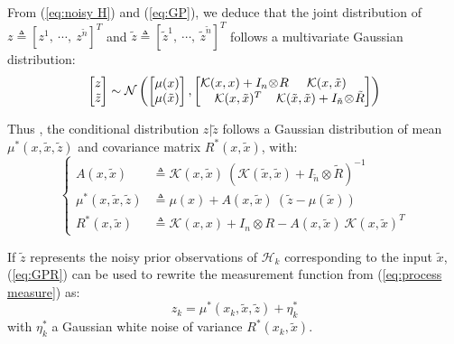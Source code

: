 \documentclass[conference]{IEEEtran}
\begin{document}
From (\ref{eq:noisy H}) and (\ref{eq:GP}), we deduce that the joint distribution of $z \triangleq [z^1, \: \cdots, \: z^{\tilde n}]^T$ and $\tilde{z} \triangleq [\tilde z^1, \: \cdots, \: \tilde z^{\tilde n}]^T$ follows a multivariate Gaussian distribution:
\begin{equation}
\begin{bmatrix}z \\ \tilde{z}\end{bmatrix} \sim \mathcal{N}\left(
\begin{bmatrix}\mu(x) \\ \mu(\tilde{x})\end{bmatrix},
\begin{bmatrix}
\mathcal{K}(       x,  x) + I_n\!\otimes\!R \hspace{-3.5mm} &
\mathcal{K}(       x,  \tilde{x}) \\
\mathcal{K}(x, \tilde{x})^T & \hspace{-3.5mm}
\mathcal{K}(\tilde{x}, \tilde{x}) + I_{\tilde n}\!\otimes\!\tilde R
\end{bmatrix}
\right)
\end{equation}

Thus \cite{bib:Rasmussen}, the conditional distribution $z|\tilde{z}$ follows a Gaussian distribution of mean $\mu^*(x, \tilde{x}, \tilde{z})$ and covariance matrix $R^*(x, \tilde{x})$, with:
\begin{equation}
\left\{
\begin{aligned}
A(x, \tilde{x}) &  \triangleq
\mathcal{K}(x, \tilde{x}) \:
\left(\mathcal{K}(\tilde{x}, \tilde{x}) + I_{\tilde n} \otimes \tilde R\right)^{-1} \\
\mu^*(x, \tilde{x}, \tilde{z}) & \triangleq
\mu(x) + A(x, \tilde{x}) \:
(\tilde{z} - \mu(\tilde{x})) \\
R^*(x, \tilde{x}) & \triangleq
\mathcal{K}(x, x) +
I_n \otimes R -
A(x, \tilde{x}) \:
\mathcal{K}(x, \tilde{x})^T
\end{aligned}
\right. \label{eq:GPR}
\end{equation}

If $\tilde{z}$ represents the noisy prior observations of $\mathcal{H}_k$ corresponding to the input $\tilde{x}$, (\ref{eq:GPR}) can be used to rewrite the measurement function from (\ref{eq:process measure}) as:
\begin{equation}
z_k = \mu^*(x_k, \tilde{x}, \tilde{z}) + \eta^*_k
\end{equation}
with $\eta^*_k$ a Gaussian white noise of variance $R^*(x_k, \tilde{x})$.
\end{document}
